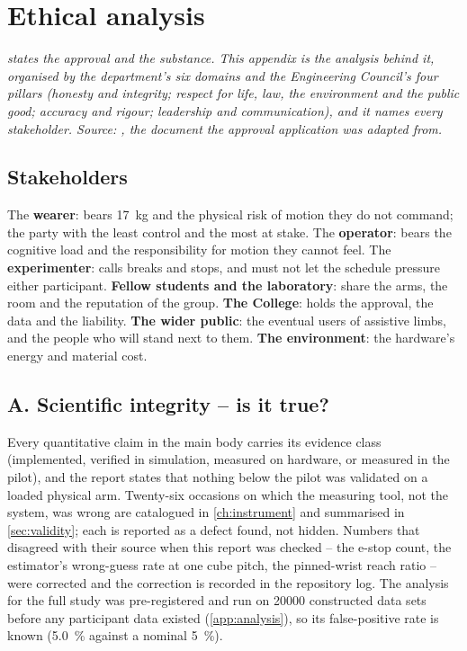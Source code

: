 \chapter{Ethical analysis}
\label{app:ethics}

\noindent\emph{ states the approval and the substance.
This appendix is the analysis behind it, organised by the department's six
domains and the Engineering Council's four pillars (honesty and integrity;
respect for life, law, the environment and the public good; accuracy and
rigour; leadership and communication), and it names every stakeholder.
Source: , the document the
approval application was adapted from.}

\section{Stakeholders}

The \textbf{wearer}: bears \SI{17}{\kilo\gram} and the physical risk of
motion they do not command; the party with the least control and the most
at stake. The \textbf{operator}: bears the cognitive load and the
responsibility for motion they cannot feel. The \textbf{experimenter}: calls
breaks and stops, and must not let the schedule pressure either
participant. \textbf{Fellow students and the laboratory}: share the arms,
the room and the reputation of the group. \textbf{The College}: holds the
approval, the data and the liability. \textbf{The wider public}: the
eventual users of assistive limbs, and the people who will stand next to
them. \textbf{The environment}: the hardware's energy and material cost.

\section{A. Scientific integrity -- is it true?}

Every quantitative claim in the main body carries its evidence class
(implemented, verified in simulation, measured on hardware, or measured in
the pilot), and the report states that nothing below the pilot was
validated on a loaded physical arm. Twenty-six occasions on which the
measuring tool, not the system, was wrong are catalogued in
\cref{ch:instrument} and summarised in \cref{sec:validity}; each is
reported as a defect found, not hidden. Numbers that disagreed with their
source when this report was checked -- the e-stop count, the estimator's
wrong-guess rate at one cube pitch, the pinned-wrist reach ratio -- were
corrected and the correction is recorded in the repository log. The
analysis for the full study was pre-registered and run on \num{20000}
constructed data sets before any participant data existed
(\cref{app:analysis}), so its false-positive rate is known
(\SI{5.0}{\percent} against a nominal \SI{5}{\percent}).

